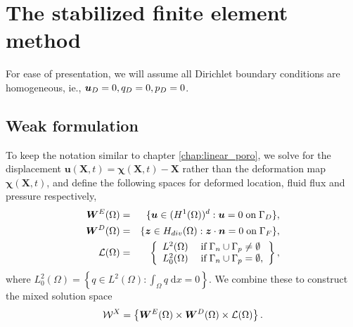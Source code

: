 \section{The stabilized finite element method}
\label{sec:fem}
For ease of presentation, we will assume all Dirichlet boundary conditions are homogeneous, ie., $\boldsymbol{u}_{D} = {\bf 0}, {q_{D}} = 0, p_{D}=0$.  %



\subsection{Weak formulation}
\label{sec:weak_forms}
To keep the notation similar to chapter \ref{chap:linear_poro}, we solve for the displacement $\boldsymbol{u}(\boldsymbol{X},t) = \boldsymbol{\chi}(\boldsymbol{X},t)-\boldsymbol{X}$ rather than the deformation map $\boldsymbol{\chi}(\boldsymbol{X},t)$, and define the following spaces for deformed location, fluid flux and pressure respectively,
\begin{eqnarray*}
\dispspace &=& \{ \dispcont \in (H^{1} (\Omega))^d :\dispcont= {\bf 0} \;\mbox{on} \;\Gamma_{D} \}, \\
\fluxspace &=& \{ \fluxcont \in H_{div}(\Omega):\fluxcont \cdot \normal = 0 \;\mbox{on} \;\Gamma_{F} \}, \\
\pspace    &=& \left\{
  \begin{array}{l l}
    L^{2}(\Omega)     &\; \text{if} \; \Gamma_{n} \cup \Gamma_{p} \neq \emptyset \\
    L^{2}_{0}(\Omega) &\; \text{if} \;\Gamma_{n} \cup \Gamma_{p} = \emptyset,
  \end{array} \right \},
\end{eqnarray*}
where
$L^{2}_{0}(\Omega) = \left\{ q \in L^{2}(\Omega) : \int_{\Omega} q\;\mbox{d}x=0\right\}$.
We combine these to construct the mixed solution space
\begin{equation*}
\mathcal{W}^{X} = \left\{ \boldsymbol{W}^{E}(\Omega)
  \times \boldsymbol{W}^{D}(\Omega)  \times  \mathcal{L}(\Omega) \right\}.
\end{equation*}


